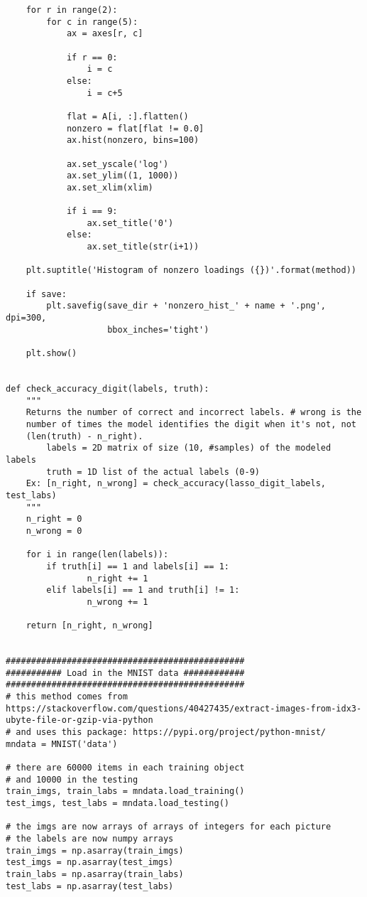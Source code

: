\documentclass[10pt]{article}
\begin{document}
\begin{lstlisting}
    for r in range(2):
        for c in range(5):
            ax = axes[r, c]
            
            if r == 0:
                i = c
            else:
                i = c+5
                
            flat = A[i, :].flatten()
            nonzero = flat[flat != 0.0]
            ax.hist(nonzero, bins=100)
            
            ax.set_yscale('log')
            ax.set_ylim((1, 1000))
            ax.set_xlim(xlim)
        
            if i == 9:
                ax.set_title('0')
            else:
                ax.set_title(str(i+1))

    plt.suptitle('Histogram of nonzero loadings ({})'.format(method))
    
    if save:
        plt.savefig(save_dir + 'nonzero_hist_' + name + '.png', dpi=300,
                    bbox_inches='tight')

    plt.show()    


def check_accuracy_digit(labels, truth):
    """
    Returns the number of correct and incorrect labels. # wrong is the
    number of times the model identifies the digit when it's not, not
    (len(truth) - n_right).
        labels = 2D matrix of size (10, #samples) of the modeled labels
        truth = 1D list of the actual labels (0-9)
    Ex: [n_right, n_wrong] = check_accuracy(lasso_digit_labels, test_labs)
    """
    n_right = 0
    n_wrong = 0
    
    for i in range(len(labels)):
        if truth[i] == 1 and labels[i] == 1:
                n_right += 1
        elif labels[i] == 1 and truth[i] != 1:
                n_wrong += 1
            
    return [n_right, n_wrong]


###############################################
########### Load in the MNIST data ############
###############################################
# this method comes from https://stackoverflow.com/questions/40427435/extract-images-from-idx3-ubyte-file-or-gzip-via-python
# and uses this package: https://pypi.org/project/python-mnist/
mndata = MNIST('data')

# there are 60000 items in each training object
# and 10000 in the testing
train_imgs, train_labs = mndata.load_training()
test_imgs, test_labs = mndata.load_testing()

# the imgs are now arrays of arrays of integers for each picture
# the labels are now numpy arrays
train_imgs = np.asarray(train_imgs)
test_imgs = np.asarray(test_imgs)
train_labs = np.asarray(train_labs)
test_labs = np.asarray(test_labs)


\end{lstlisting}
\end{document}
